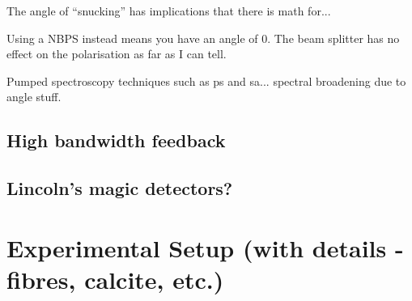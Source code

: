 The angle of ``snucking'' has implications that there is math for...

Using a NBPS instead means you have an angle of 0.
The beam splitter has no effect on the polarisation as far as I can tell.

Pumped spectroscopy techniques such as \gls{ps} and \gls{sa}... spectral broadening due to angle stuff.

\subsection{High bandwidth feedback}


\subsection{Lincoln's magic detectors?}

\section{Experimental Setup (with details - fibres, calcite, etc.)}

